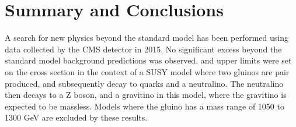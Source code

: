\chapter{Summary and Conclusions}
\label {ch:conclusion}
A search for new physics beyond the standard model has been performed using data collected by the CMS detector in 2015.
No significant excess beyond the standard model background predictions was observed,
and upper limits were set on the cross section in the context of a SUSY model where two gluinos are pair produced,
and subsequently decay to quarks and a neutralino.
The neutralino then decays to a Z boson, and a gravitino in this model, where the gravitino is expected to be massless.
Models where the gluino has a mass range of 1050 to 1300 GeV are excluded by these results.

